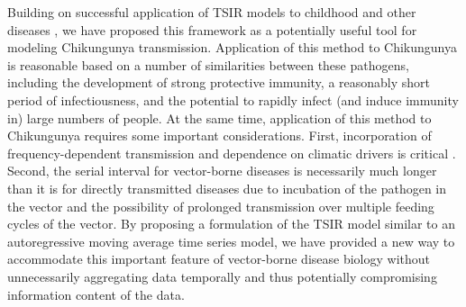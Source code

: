 \documentclass[11pt]{article}
\begin{document}
Building on successful application of TSIR models to childhood and other diseases \cite{Finkenstadt2000,Grenfell2001,Koelle2004,Xia2004,Pascual2008,Metcalf2010,Metcalf2011,Reich2013}, we have proposed this framework as a potentially useful tool for modeling Chikungunya transmission. Application of this method to Chikungunya is reasonable based on a number of similarities between these pathogens, including the development of strong protective immunity, a reasonably short period of infectiousness, and the potential to rapidly infect (and induce immunity in) large numbers of people. At the same time, application of this method to Chikungunya requires some important considerations. First, incorporation of frequency-dependent transmission and dependence on climatic drivers is critical \cite{Koelle2004,Pascual2008}. Second, the serial interval for vector-borne diseases is necessarily much longer than it is for directly transmitted diseases due to incubation of the pathogen in the vector and the possibility of prolonged transmission over multiple feeding cycles of the vector. By proposing a formulation of the TSIR model similar to an autoregressive moving average time series model, we have provided a new way to accommodate this important feature of vector-borne disease biology without unnecessarily aggregating data temporally and thus potentially compromising information content of the data.
\end{document}
